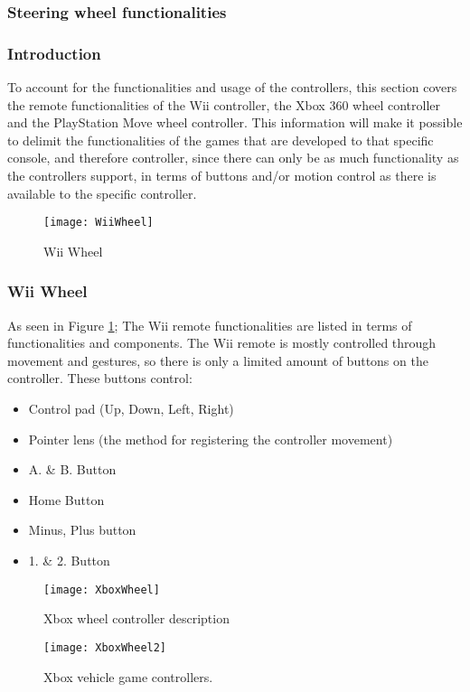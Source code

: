 \subsubsection{Steering wheel functionalities}
\subsubsection*{Introduction}
To account for the functionalities and usage of the controllers, this section covers the remote functionalities of the Wii controller, the Xbox 360 wheel controller and the PlayStation Move wheel controller. This information will make it possible to delimit the functionalities of the games that are developed to that specific console, and therefore controller, since there can only be as much functionality as the controllers support, in terms of buttons and/or motion control as there is available to the specific controller.

\begin{figure}[h] 
\centering
\texttt{[image: WiiWheel]} 
\caption{Wii Wheel \parencite{Nintendo2013}}
\label{fig:Wiimote}
\end{figure}
\bigskip

\subsubsection*{Wii Wheel}
\parencite{Nintendo2013}\newline
As seen in Figure \ref{fig:Wiimote}; The Wii remote functionalities are listed in terms of functionalities and components. The Wii remote is mostly controlled through movement and gestures, so there is only a limited amount of buttons on the controller. These buttons control:
\begin{itemize}
\item Control pad (Up, Down, Left, Right)
\item Pointer lens (the method for registering the controller movement)
\item A. \& B. Button
\item Home Button
\item Minus, Plus button
\item 1. \& 2. Button
\end{itemize}
\bigskip

\begin{figure}[h] 
\centering
\caption{Xbox wheel controller description \parencite{Xbox2013}}
\label{fig:XboxWheel}
\texttt{[image: XboxWheel]} 
\end{figure}
\begin{figure}[h]
\centering
\texttt{[image: XboxWheel2]}
\caption{Xbox vehicle game controllers. \parencite{Xbox2013}}
\label{fig:XboxWheel2}
\end{figure}


